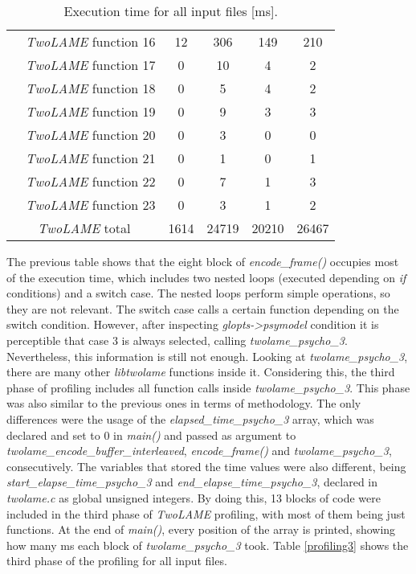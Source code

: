 \documentclass{article}
\begin{document}
\begin{table}[H]
\begin{tabular}{|c|c|c|c|c|c|}
    \cline{2-6}
    & \multicolumn{1}{c|}{\textit{TwoLAME} function 16} & 12 & 306 & 149 & 210 \\
    \cline{2-6}
    & \multicolumn{1}{c|}{\textit{TwoLAME} function 17} & 0 & 10 & 4 & 2 \\
    \cline{2-6}
    & \multicolumn{1}{c|}{\textit{TwoLAME} function 18} & 0 & 5 & 4 & 2 \\
    \cline{2-6}
    & \multicolumn{1}{c|}{\textit{TwoLAME} function 19} & 0 & 9 & 3 &  3 \\
    \cline{2-6}
    & \multicolumn{1}{c|}{\textit{TwoLAME} function 20} & 0 & 3 & 0 &  0 \\
    \cline{2-6}
    & \multicolumn{1}{c|}{\textit{TwoLAME} function 21} & 0 & 1 & 0 & 1  \\
    \cline{2-6}
    & \multicolumn{1}{c|}{\textit{TwoLAME} function 22} & 0 & 7 & 1 & 3  \\
    \cline{2-6}
    & \multicolumn{1}{c|}{\textit{TwoLAME} function 23} & 0 & 3 & 1 &  2  \\ 
    \hline
    \multicolumn{2}{|c|}{\textit{TwoLAME} total}  & 1614 & 24719 & 20210 & 26467 \\ 
    \hline
    \end{tabular}
    \caption{Execution time for all input files [ms].}
    \label{profiling2}
\end{table}

\vspace{1cm}

The previous table shows that the eight block of \textit{encode\_frame()} occupies most of the execution time, which includes two nested loops (executed depending on \textit{if} conditions) and a switch case. The nested loops perform simple operations, so they are not relevant. The switch case calls a certain function depending on the switch condition. However, after inspecting \textit{glopts->psymodel} condition it is perceptible that case 3 is always selected, calling \textit{twolame\_psycho\_3}. Nevertheless, this information is still not enough. 
Looking at \textit{twolame\_psycho\_3}, there are many other \textit{libtwolame} functions inside it. Considering this, the third phase of profiling includes all function calls inside \textit{twolame\_psycho\_3}. 
This phase was also similar to the previous ones in terms of methodology. The only differences were the usage of the \textit{elapsed\_time\_psycho\_3} array, which was declared and set to 0 in \textit{main()} and passed as argument to \textit{twolame\_encode\_buffer\_interleaved}, \textit{encode\_frame()} and \textit{twolame\_psycho\_3}, consecutively. The variables that stored the time values were also different, being \textit{start\_elapse\_time\_psycho\_3} and \textit{end\_elapse\_time\_psycho\_3}, declared in \textit{twolame.c} as global unsigned integers.
By doing this, 13 blocks of code were included in the third phase of \textit{TwoLAME} profiling, with most of them being just functions.
At the end of \textit{main()}, every position of the array is printed, showing how many ms each block of \textit{twolame\_psycho\_3} took. 
Table \ref{profiling3} shows the third phase of the profiling for all input files.
\end{document}
